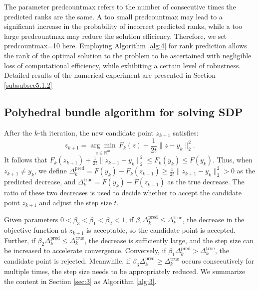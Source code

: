 \documentclass{jcmlatex}
\begin{document}
The parameter \(\text{predcountmax}\) refers to the number of consecutive times the predicted ranks are the same. A too small predcountmax may lead to a significant increase in the probability of incorrect predicted ranks, while a too large predcountmax may reduce the solution efficiency. Therefore, we set predcountmax=10 here. Employing Algorithm \ref{alg:4} for rank prediction allows the rank of the optimal solution to the problem to be ascertained with negligible loss of computational efficiency, while exhibiting a certain level of robustness. Detailed results of the numerical experiment are presented in Section \ref{subsubsec5.1.2} 
\subsection{Polyhedral bundle algorithm for solving SDP}
After the \(k\)-th iteration, the new candidate point \(z_{k+1}\) satisfies:  
\begin{equation*}
z_{k+1} = \underset{z \in \mathbb{R}^{m}}{\arg\min} \, F_{k}(z) + \frac{1}{2t}\|z - y_{k}\|_{2}^{2}.
\end{equation*}  
It follows that \(F_{k}(z_{k+1}) + \frac{1}{2t}\|z_{k+1} - y_{k}\|_{2}^{2} \leq F_{k}(y_{k}) \leq F(y_{k})\). Thus, when \(z_{k+1} \neq y_{k}\), we define \(\Delta_{k}^{\text{pred}} = F(y_{k}) - F_{k}(z_{k+1}) \geq \frac{1}{2t}\|z_{k+1} - y_{k}\|_{2}^{2} > 0\) as the predicted decrease, and \(\Delta_{k}^{\text{true}} = F(y_{k}) - F(z_{k+1})\) as the true decrease. The ratio of these two decreases is used to decide whether to accept the candidate point \(z_{k+1}\) and adjust the step size \(t\).  

Given parameters \(0 < \beta_{3} < \beta_{1} < \beta_{2} < 1\), if \(\beta_{1}\Delta_{k}^{\text{pred}} \leq \Delta_{k}^{\text{true}}\), the decrease in the objective function at \(z_{k+1}\) is acceptable, so the candidate point is accepted. Further, if \(\beta_{2}\Delta_{k}^{\text{pred}} \leq \Delta_{k}^{\text{true}}\), the decrease is sufficiently large, and the step size can be increased to accelerate convergence. Conversely, if \(\beta_{1}\Delta_{k}^{\text{pred}} > \Delta_{k}^{\text{true}}\), the candidate point is rejected. Meanwhile, if \(\beta_{3}\Delta_{k}^{\text{pred}} \geq \Delta_{k}^{\text{true}}\) occurs consecutively for multiple times, the step size needs to be appropriately reduced. We summarize the content in Section \ref{sec:3} as Algorithm \ref{alg:3}.
\end{document}
